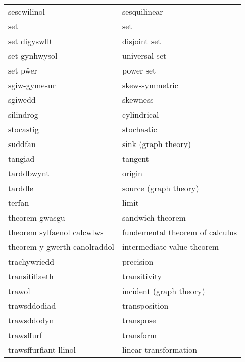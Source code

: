 \begin{supertabular}{p{0.22\textwidth}p{0.22\textwidth}}
                    sescwilinol &                     sesquilinear \\
                            set &                              set \\
                  set digyswllt &                     disjoint set \\
                  set gynhwysol &                    universal set \\
                       set pŵer &                        power set \\
                   sgiw-gymesur &                   skew-symmetric \\
                        sgiwedd &                         skewness \\
                      silindrog &                      cylindrical \\
                      stocastig &                       stochastic \\
                        suddfan &              sink (graph theory) \\
                        tangiad &                          tangent \\
                     tarddbwynt &                           origin \\
                        tarddle &            source (graph theory) \\
                         terfan &                            limit \\
                 theorem gwasgu &                 sandwich theorem \\
     theorem sylfaenol calcwlws &  fundemental theorem of calculus \\
   theorem y gwerth canolraddol &       intermediate value theorem \\
                   trachywriedd &                        precision \\
                 transitifiaeth &                     transitivity \\
                         trawol &          incident (graph theory) \\
                   trawsddodiad &                    transposition \\
                    trawsddodyn &                        transpose \\
                     trawsffurf &                        transform \\
          trawsffurfiant llinol &            linear transformation \\

\end{supertabular}
